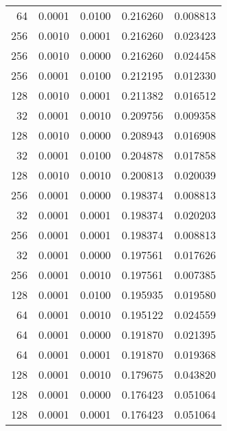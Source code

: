 \begin{tabular}{rrrrr}
  64 &  0.0001 &  0.0100 &  0.216260 &  0.008813 \\
 256 &  0.0010 &  0.0001 &  0.216260 &  0.023423 \\
 256 &  0.0010 &  0.0000 &  0.216260 &  0.024458 \\
 256 &  0.0001 &  0.0100 &  0.212195 &  0.012330 \\
 128 &  0.0010 &  0.0001 &  0.211382 &  0.016512 \\
  32 &  0.0001 &  0.0010 &  0.209756 &  0.009358 \\
 128 &  0.0010 &  0.0000 &  0.208943 &  0.016908 \\
  32 &  0.0001 &  0.0100 &  0.204878 &  0.017858 \\
 128 &  0.0010 &  0.0010 &  0.200813 &  0.020039 \\
 256 &  0.0001 &  0.0000 &  0.198374 &  0.008813 \\
  32 &  0.0001 &  0.0001 &  0.198374 &  0.020203 \\
 256 &  0.0001 &  0.0001 &  0.198374 &  0.008813 \\
  32 &  0.0001 &  0.0000 &  0.197561 &  0.017626 \\
 256 &  0.0001 &  0.0010 &  0.197561 &  0.007385 \\
 128 &  0.0001 &  0.0100 &  0.195935 &  0.019580 \\
  64 &  0.0001 &  0.0010 &  0.195122 &  0.024559 \\
  64 &  0.0001 &  0.0000 &  0.191870 &  0.021395 \\
  64 &  0.0001 &  0.0001 &  0.191870 &  0.019368 \\
 128 &  0.0001 &  0.0010 &  0.179675 &  0.043820 \\
 128 &  0.0001 &  0.0000 &  0.176423 &  0.051064 \\
 128 &  0.0001 &  0.0001 &  0.176423 &  0.051064 \\
\bottomrule
\end{tabular}
